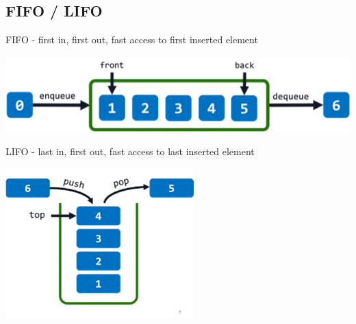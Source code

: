 \subsection{FIFO / LIFO}
    FIFO - first in, first out, fast access to first inserted element
    {\centering \includegraphics[width = 0.8\linewidth]{src/5_data_structure/images/fifo.png} \par}
    LIFO - last in, first out, fast access to last inserted element
    {\centering \includegraphics[width = 0.5\linewidth]{src/5_data_structure/images/lifo.png} \par}
